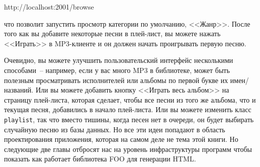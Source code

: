 \begin{myverb}
  http://localhost:2001/browse
\end{myverb}

\noindent{}что позволит запустить просмотр категории по умолчанию, <<Жанр>>. После того как вы
добавите некоторые песни в плей-лист, вы можете нажать <<Играть>> в MP3-клиенте и он должен
начать проигрывать первую песню. 

Очевидно, вы можете улучшить пользовательский интерфейс несколькими способами~-- например,
если у вас много MP3 в библиотеке, может быть полезным просматривать исполнителей или
альбомы по первой букве их имен/названий. Или вы можете добавить кнопку <<Играть весь
альбом>> на страницу плей-листа, которая сделает, чтобы все песни из того же альбома, что и
текущая песня, добавились в начало плей-листа. Или вы можете изменить класс \lstinline{playlist},
так что вместо тишины, когда песен нет в очереди, он будет выбирать случайную песню из базы
данных. Но все эти идеи попадают в область проектирования приложения, которая на самом деле
не тема этой книги. Но следующие две главы отбросят нас на уровень инфраструктуры программ
чтобы показать как работает библиотека FOO для генерации HTML.

